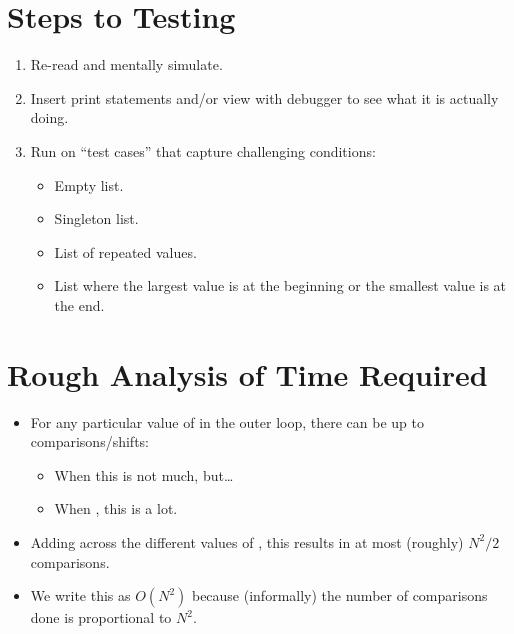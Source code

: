 \documentclass[letterpaper,10pt,english]{sphinxmanual}
\begin{document}
\section{Steps to Testing}
\label{\detokenize{lecture_notes/lec21_sorting:steps-to-testing}}\begin{enumerate}
\def\theenumi{\arabic{enumi}}
\def\labelenumi{\theenumi .}
\makeatletter\def\p@enumii{\p@enumi \theenumi .}\makeatother
\item {} 
Re-read and mentally simulate.

\item {} 
Insert print statements and/or view with debugger to see what it is
actually doing.

\item {} 
Run on “test cases” that capture challenging conditions:
\begin{itemize}
\item {} 
Empty list.

\item {} 
Singleton list.

\item {} 
List of repeated values.

\item {} 
List where the largest value is at the beginning or the smallest
value is at the end.

\end{itemize}

\end{enumerate}


\section{Rough Analysis of Time Required}
\label{\detokenize{lecture_notes/lec21_sorting:rough-analysis-of-time-required}}\begin{itemize}
\item {} 
For any particular value of  in the outer  loop, there
can be up to  comparisons/shifts:
\begin{itemize}
\item {} 
When  this is not much, but…

\item {} 
When , this is a lot.

\end{itemize}

\item {} 
Adding across the different values of , this results in at most
(roughly) \(N^2/2\) comparisons.

\item {} 
We write this as \(O(N^2)\) because (informally) the number of
comparisons done is proportional to \(N^2\).

\end{itemize}
\end{document}
